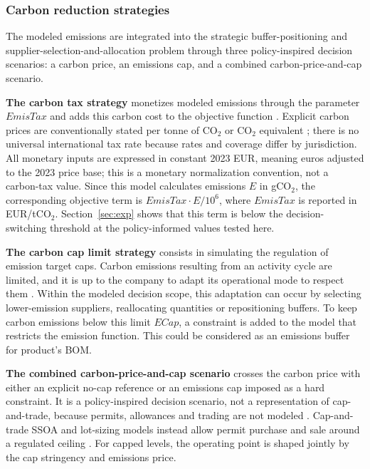 \documentclass[preprint,12pt,authoryear]{elsarticle}
\begin{document}
\subsubsection{Carbon reduction strategies}\label{ss:strat}
The modeled emissions are integrated into the strategic buffer-positioning and supplier-selection-and-allocation problem through three policy-inspired decision scenarios: a carbon price, an emissions cap, and a combined carbon-price-and-cap scenario.

\textbf{The carbon tax strategy} monetizes modeled emissions through the parameter $EmisTax$ and adds this carbon cost to the objective function \citep{Choi2013,he2015,toptal2014}. Explicit carbon prices are conventionally stated per tonne of CO$_2$ or CO$_2$ equivalent \citep{WorldBankCarbonPricing,OECD2025ECR}; there is no universal international tax rate because rates and coverage differ by jurisdiction. All monetary inputs are expressed in constant 2023 EUR, meaning euros adjusted to the 2023 price base; this is a monetary normalization convention, not a carbon-tax value. Since this model calculates emissions $E$ in gCO$_2$, the corresponding objective term is $EmisTax\cdot E/10^{6}$, where $EmisTax$ is reported in EUR/tCO$_2$. Section~\ref{sec:exp} shows that this term is below the decision-switching threshold at the policy-informed values tested here.

\textbf{The carbon cap limit strategy} consists in simulating the regulation of emission target caps. Carbon emissions resulting from an activity cycle are limited, and it is up to the company to adapt its operational mode to respect them \citep{Matthews2008,lamba2019cie,chowdhury2020}. Within the modeled decision scope, this adaptation can occur by selecting lower-emission suppliers, reallocating quantities or repositioning buffers. To keep carbon emissions below this limit $ECap$, a constraint is added to the model that restricts the emission function. This could be considered as an emissions buffer for product's BOM.

\textbf{The combined carbon-price-and-cap scenario} crosses the carbon price with either an explicit no-cap reference or an emissions cap imposed as a hard constraint. It is a policy-inspired decision scenario, not a representation of cap-and-trade, because permits, allowances and trading are not modeled \citep{mirzaee2023,lamba2019cie,rosyidi2024}. Cap-and-trade SSOA and lot-sizing models instead allow permit purchase and sale around a regulated ceiling \citep{he2015,rosyidi2024}. For capped levels, the operating point is shaped jointly by the cap stringency and emissions price.
\end{document}
